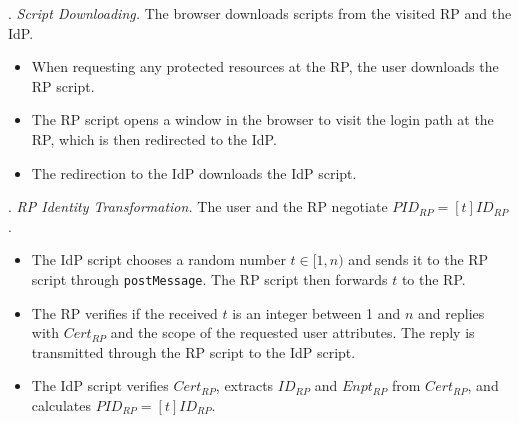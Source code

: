 \vspace{0.75mm}
. {\em Script Downloading.}
The browser downloads scripts from the visited RP and the IdP.
\vspace{-\topsep}
\begin{itemize}
\setlength{\topsep}{0pt}
\setlength{\partopsep}{0pt}
\setlength{\itemsep}{0pt}
\setlength{\parsep}{0pt}
\setlength{\parskip}{0pt}
\item[1.1]
When requesting any protected resources at the RP, the user downloads the RP script.
\item[1.2]
The RP script opens a window in the browser to visit the login path at the RP, which is then redirected to the IdP.
\item[1.3]
The redirection to the IdP downloads the IdP script.
\end{itemize}



. {\em RP Identity Transformation.}
The user and the RP negotiate $PID_{RP} = [t]{ID_{RP}}$.
\vspace{-\topsep}
\begin{itemize}
\setlength{\topsep}{0pt}
\setlength{\partopsep}{0pt}
\setlength{\itemsep}{0pt}
\setlength{\parsep}{0pt}
\setlength{\parskip}{0pt}
\item[2.1] The IdP script chooses a random number $t \in [1, n)$ and sends it to the RP script through \verb+postMessage+. The RP script then forwards $t$ to the RP.
\item[2.2] The RP verifies if the received $t$ is an integer between 1 and $n$ and 
replies with $Cert_{RP}$ and the scope of the requested user attributes. The reply is transmitted through the RP script to the IdP script.  %
\item[2.3] The IdP script verifies $Cert_{RP}$, extracts $ID_{RP}$ and $Enpt_{RP}$ from $Cert_{RP}$, and calculates $PID_{RP}=[t]{ID_{RP}}$.

\end{itemize}


